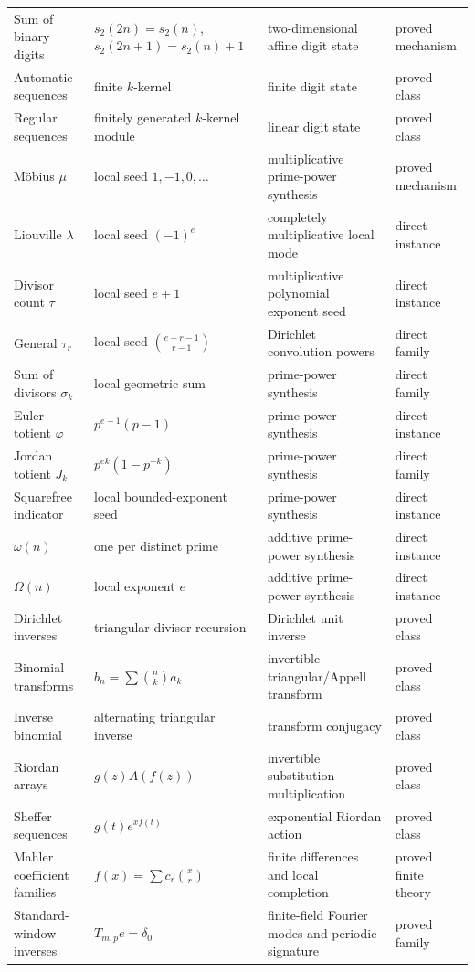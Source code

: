 \documentclass[11pt]{article}
\theoremstyle{definition}\newtheorem{definition}[theorem]{Definition}\newtheorem{example}[theorem]{Example}\newtheorem{construction}[theorem]{Construction}\newtheorem{algorithm}[theorem]{Algorithm}\newtheorem{conjecture}[theorem]{Conjecture}\newtheorem{problem}[theorem]{Problem}
\theoremstyle{remark}\newtheorem{remark}[theorem]{Remark}\newtheorem{boundary}[theorem]{Boundary}\newtheorem{certificate}[theorem]{Computational Certificate}\newtheorem{classical}[theorem]{Classical Input}\newtheorem{principle}[theorem]{Structural Principle}
\begin{document}
\begin{longtable}{L{.15\textwidth}L{.20\textwidth}L{.28\textwidth}L{.18\textwidth}}
Sum of binary digits&$s_2(2n)=s_2(n)$, $s_2(2n+1)=s_2(n)+1$&two-dimensional affine digit state&proved mechanism\\
Automatic sequences&finite $k$-kernel&finite digit state&proved class\\
Regular sequences&finitely generated $k$-kernel module&linear digit state&proved class\\
M\"obius $\mu$&local seed $1,-1,0,\ldots$&multiplicative prime-power synthesis&proved mechanism\\
Liouville $\lambda$&local seed $(-1)^e$&completely multiplicative local mode&direct instance\\
Divisor count $\tau$&local seed $e+1$&multiplicative polynomial exponent seed&direct instance\\
General $\tau_r$&local seed $\binom{e+r-1}{r-1}$&Dirichlet convolution powers&direct family\\
Sum of divisors $\sigma_k$&local geometric sum&prime-power synthesis&direct family\\
Euler totient $\varphi$&$p^{e-1}(p-1)$&prime-power synthesis&direct instance\\
Jordan totient $J_k$&$p^{ek}(1-p^{-k})$&prime-power synthesis&direct family\\
Squarefree indicator&local bounded-exponent seed&prime-power synthesis&direct instance\\
$\omega(n)$&one per distinct prime&additive prime-power synthesis&direct instance\\
$\Omega(n)$&local exponent $e$&additive prime-power synthesis&direct instance\\
Dirichlet inverses&triangular divisor recursion&Dirichlet unit inverse&proved class\\
Binomial transforms&$b_n=\sum\binom nk a_k$&invertible triangular/Appell transform&proved class\\
Inverse binomial&alternating triangular inverse&transform conjugacy&proved class\\
Riordan arrays&$g(z)A(f(z))$&invertible substitution-multiplication&proved class\\
Sheffer sequences&$g(t)e^{xf(t)}$&exponential Riordan action&proved class\\
Mahler coefficient families&$f(x)=\sum c_r\binom xr$&finite differences and local completion&proved finite theory\\
Standard-window inverses&$T_{m,p}e=\delta_0$&finite-field Fourier modes and periodic signature&proved family\\

\end{longtable}
\end{document}
